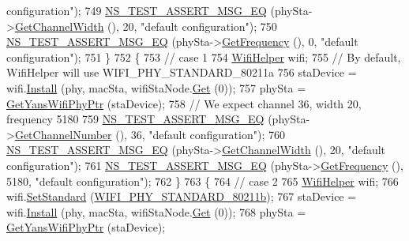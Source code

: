 \begin{DoxyCode}
{       configuration"});
749     \hyperlink{group__testing_ga2a9d78cffb3db8e867c35fff0b698cf5}{NS\_TEST\_ASSERT\_MSG\_EQ} (phySta->\hyperlink{classns3_1_1WifiPhy_a4a5d5009b3b3308f2baeed42a2007189}{GetChannelWidth} (), 20, \textcolor{stringliteral}{"default
       configuration"});
750     \hyperlink{group__testing_ga2a9d78cffb3db8e867c35fff0b698cf5}{NS\_TEST\_ASSERT\_MSG\_EQ} (phySta->\hyperlink{classns3_1_1WifiPhy_ad2508d94faf22d690d6b8b4367934fd1}{GetFrequency} (), 0, \textcolor{stringliteral}{"default
       configuration"});
751   \}
752   \{
753     \textcolor{comment}{// case 1}
754     \hyperlink{classns3_1_1WifiHelper}{WifiHelper} wifi;
755     \textcolor{comment}{// By default, WifiHelper will use WIFI\_PHY\_STANDARD\_80211a}
756     staDevice = wifi.\hyperlink{classns3_1_1WifiHelper_a451b3d33fa1497c22f06c5451f57a127}{Install} (phy, macSta, wifiStaNode.\hyperlink{classns3_1_1NodeContainer_a9ed96e2ecc22e0f5a3d4842eb9bf90bf}{Get} (0));
757     phySta = \hyperlink{classSetChannelFrequencyTest_aa30a0a39f98c2d825152681ba8b9f4e1}{GetYansWifiPhyPtr} (staDevice);
758     \textcolor{comment}{// We expect channel 36, width 20, frequency 5180}
759     \hyperlink{group__testing_ga2a9d78cffb3db8e867c35fff0b698cf5}{NS\_TEST\_ASSERT\_MSG\_EQ} (phySta->\hyperlink{classns3_1_1WifiPhy_a5cf0ccf06109ace61db51c83e91b7e8d}{GetChannelNumber} (), 36, \textcolor{stringliteral}{"default
       configuration"});
760     \hyperlink{group__testing_ga2a9d78cffb3db8e867c35fff0b698cf5}{NS\_TEST\_ASSERT\_MSG\_EQ} (phySta->\hyperlink{classns3_1_1WifiPhy_a4a5d5009b3b3308f2baeed42a2007189}{GetChannelWidth} (), 20, \textcolor{stringliteral}{"default
       configuration"});
761     \hyperlink{group__testing_ga2a9d78cffb3db8e867c35fff0b698cf5}{NS\_TEST\_ASSERT\_MSG\_EQ} (phySta->\hyperlink{classns3_1_1WifiPhy_ad2508d94faf22d690d6b8b4367934fd1}{GetFrequency} (), 5180, \textcolor{stringliteral}{"default
       configuration"});
762   \}
763   \{
764     \textcolor{comment}{// case 2}
765     \hyperlink{classns3_1_1WifiHelper}{WifiHelper} wifi;
766     wifi.\hyperlink{classns3_1_1WifiHelper_aa54f3e61527ef8de318d310045bc5dfd}{SetStandard} (\hyperlink{group__wifi_gga1299834f4e1c615af3ca738033b76a49a77e1cc9f77a0bce8e2bc82cbef437b5a}{WIFI\_PHY\_STANDARD\_80211b});
767     staDevice = wifi.\hyperlink{classns3_1_1WifiHelper_a451b3d33fa1497c22f06c5451f57a127}{Install} (phy, macSta, wifiStaNode.\hyperlink{classns3_1_1NodeContainer_a9ed96e2ecc22e0f5a3d4842eb9bf90bf}{Get} (0));
768     phySta = \hyperlink{classSetChannelFrequencyTest_aa30a0a39f98c2d825152681ba8b9f4e1}{GetYansWifiPhyPtr} (staDevice);

\end{DoxyCode}
